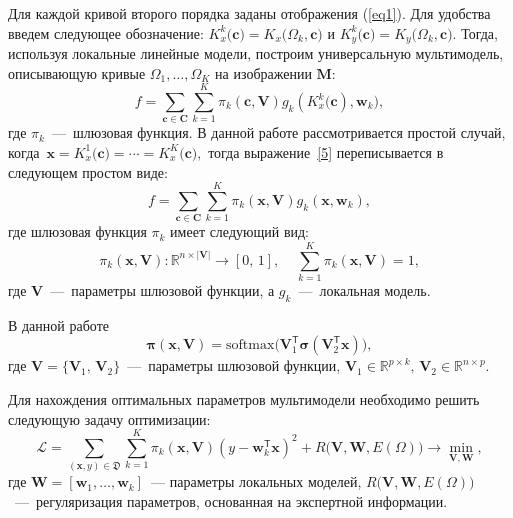 \documentclass[12pt, twoside]{article}
\numberwithin{equation}{section}
\begin{document}
Для каждой кривой второго порядка заданы отображения (\ref{eq1}). Для удобства введем следующее обозначение: $K_x^k\bigr(\mathbf{c}\bigr) = K_x\bigr(\Omega_k, \mathbf{c}\bigr)$ и $K_y^k\bigr(\mathbf{c}\bigr) = K_y\bigr(\Omega_k, \mathbf{c}\bigr)$. Тогда, используя локальные линейные модели, построим универсальную мультимодель, описывающую кривые $\Omega_1, \dots, \Omega_K$ на изображении $\mathbf{M}$:
\begin{equation}
\label{5}
	f = \sum\limits_{\mathbf{c} \in \mathbf{C}} \sum_{k = 1}^{K} \pi_k(\mathbf{c}, \mathbf{V})g_k(K^k_{x}\bigl(\mathbf{c}), \mathbf{w}_k), 
\end{equation}
где $\pi_k$~---~шлюзовая функция. В данной работе рассмотривается простой случай, когда~$\mathbf{x}=K^1_{x}\bigl(\mathbf{c})=\cdots=K^K_{x}\bigl(\mathbf{c}),$ тогда выражение~\eqref{5} переписывается в следующем простом виде:
\begin{equation}
\label{5_1}
	f = \sum\limits_{\mathbf{c} \in \mathbf{C}} \sum_{k = 1}^{K} \pi_k(\mathbf{x}, \mathbf{V})g_k(\mathbf{x}, \mathbf{w}_k), 
\end{equation}
где шлюзовая функция $\pi_k$ имеет следующий вид:
\begin{equation}
\label{6}
	\pi_k(\mathbf{x}, \mathbf{V}): \mathbb{R}^{n\times |\mathbf{V}|} \rightarrow [0, \, 1], \; \; \; \; \sum\limits_{k = 1}^{K}\pi_k(\mathbf{x}, \mathbf{V}) = 1,
\end{equation}
где $\mathbf{V}$~---~параметры шлюзовой функции, а $g_k$~---~локальная модель.
    
В данной работе
\begin{equation}
    \boldsymbol{\pi}(\mathbf{x}, \mathbf{V}) = \text{softmax}\bigl(\mathbf{V}_1^{\mathsf{T}}\boldsymbol{\sigma}(\mathbf{V}_2^{\mathsf{T}}\mathbf{x}) \bigr),
\end{equation}
где $\mathbf{V} = \{ \mathbf{V}_1, \, \mathbf{V}_2\}$~---~параметры шлюзовой функции, $\mathbf{V}_1 \in \mathbb{R}^{p \times k}, \, \mathbf{V}_2 \in \mathbb{R}^{n \times p}$. 

Для нахождения оптимальных параметров мультимодели необходимо решить следующую задачу оптимизации:
\begin{equation}\label{9}
\mathcal{L} = \sum\limits_{(\mathbf{x}, y) \in \mathfrak{D}} \sum\limits_{k = 1}^{K} \pi_k(\mathbf{x}, \mathbf{V})(y - \mathbf{w}_k^{\mathsf{T}}\mathbf{x})^2 + R\bigl(\mathbf{V}, \mathbf{W}, E(\Omega)\bigr) \rightarrow \min_{\mathbf{V}, \mathbf{W}},
\end{equation}
где $\mathbf{W} = [\mathbf{w}_1, \dots, \mathbf{w}_k]$~--- параметры локальных моделей, $R\bigl(\mathbf{V}, \mathbf{W}, E(\Omega)\bigr)$~---~регуляризация параметров, основанная на экспертной информации.
\end{document}
